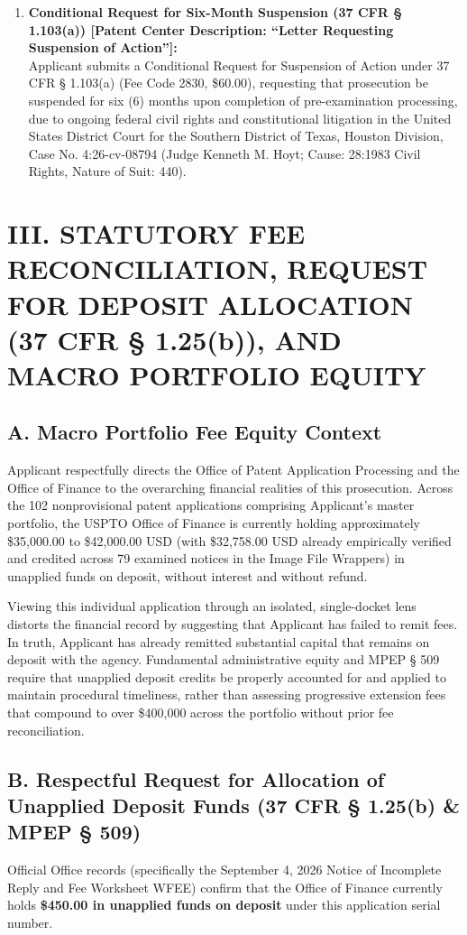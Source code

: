 \documentclass[11pt,letterpaper]{article}
\begin{document}
\begin{enumerate}[leftmargin=*]
    \item \textbf{Conditional Request for Six-Month Suspension (37 CFR \S{} 1.103(a)) [Patent Center Description: ``Letter Requesting Suspension of Action'']:} \\
    Applicant submits a Conditional Request for Suspension of Action under 37 CFR \S{} 1.103(a) (Fee Code 2830, \$60.00), requesting that prosecution be suspended for six (6) months upon completion of pre-examination processing, due to ongoing federal civil rights and constitutional litigation in the United States District Court for the Southern District of Texas, Houston Division, Case No. 4:26-cv-08794 (Judge Kenneth M. Hoyt; Cause: 28:1983 Civil Rights, Nature of Suit: 440).
\end{enumerate}

\section*{III. STATUTORY FEE RECONCILIATION, REQUEST FOR DEPOSIT ALLOCATION (37 CFR \S{} 1.25(b)), AND MACRO PORTFOLIO EQUITY}

\subsection*{A. Macro Portfolio Fee Equity Context}
Applicant respectfully directs the Office of Patent Application Processing and the Office of Finance to the overarching financial realities of this prosecution. Across the 102 nonprovisional patent applications comprising Applicant's master portfolio, the USPTO Office of Finance is currently holding approximately \$35,000.00 to \$42,000.00 USD (with \$32,758.00 USD already empirically verified and credited across 79 examined notices in the Image File Wrappers) in unapplied funds on deposit, without interest and without refund.

Viewing this individual application through an isolated, single-docket lens distorts the financial record by suggesting that Applicant has failed to remit fees. In truth, Applicant has already remitted substantial capital that remains on deposit with the agency. Fundamental administrative equity and MPEP \S{} 509 require that unapplied deposit credits be properly accounted for and applied to maintain procedural timeliness, rather than assessing progressive extension fees that compound to over \$400,000 across the portfolio without prior fee reconciliation.

\subsection*{B. Respectful Request for Allocation of Unapplied Deposit Funds (37 CFR \S{} 1.25(b) \& MPEP \S{} 509)}
Official Office records (specifically the September 4, 2026 Notice of Incomplete Reply and Fee Worksheet WFEE) confirm that the Office of Finance currently holds \textbf{\$450.00 in unapplied funds on deposit} under this application serial number.
\end{document}
